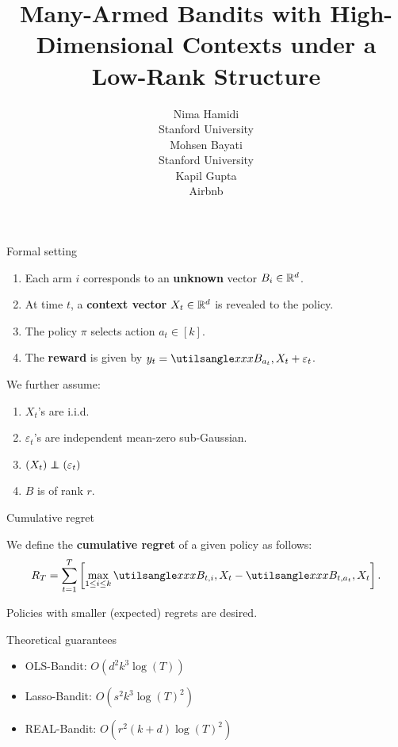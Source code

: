 \documentclass{beamer}
\title[REAL-Bandit]{Many-Armed Bandits with High-Dimensional Contexts under a Low-Rank Structure}
\author[N. Hamidi, M. Bayati, K. Gupta]{Nima Hamidi\\{\scriptsize Stanford University}\\\vskip3mm
Mohsen Bayati\\{\scriptsize Stanford University}\\\vskip3mm
Kapil Gupta\\{\scriptsize Airbnb}}
\date{}
\newcommand\independent{\protect\mathpalette{\protect\independenT}{\perp}}
\def\independenT#1#2{\mathrel{\rlap{$#1#2$}\mkern2mu{#1#2}}}
\begin{document}
\begin{frame}
\titlepage %
\end{frame}

\begin{frame}{Formal setting}
\begin{enumerate}
    \item Each arm $i$ corresponds to an \textbf{unknown} vector $B_i\in\mathbb{R}^d$.
    \vskip7mm
    \item At time $t$, a \textbf{context vector} $X_t\in\mathbb{R}^d$ is revealed to the policy.
    \vskip7mm
    \item The policy $\pi$ selects action $a_t\in[k]$.
    \vskip7mm
    \item The \textbf{reward} is given by $y_t=\inner{B_{a_t}, X_t}+\varepsilon_{t}$.
\end{enumerate}
\pause
\bigskip

We further assume:
\begin{enumerate}
\item $X_t$'s are i.i.d.
\item $\varepsilon_t$'s are independent mean-zero sub-Gaussian.
\item $(X_t)\independent(\varepsilon_t)$
\item $B$ is of rank $r$.
\end{enumerate}

\end{frame}

\begin{frame}{Cumulative regret}
\begin{definition}
We define the \textbf{cumulative regret} of a given policy as follows:
\begin{align*}
R_T=\sum_{t=1}^T\left[\max_{1\leq i\leq k}\inner{B_{t,i},X_t}-\inner{B_{t,a_t},X_t}\right].
\end{align*}
\end{definition}
Policies with smaller (expected) regrets are desired.
\end{frame}

\begin{frame}{Theoretical guarantees}
    \begin{itemize}
        \item OLS-Bandit: $O(d^2k^3\log(T))$ {\color{blue}\cite{ols-bandit}}
        \vskip7mm
        \item Lasso-Bandit: $O(s^2k^3\log(T)^2)$ {\color{blue}\cite{lasso-bandit}}
        \vskip7mm
        \item REAL-Bandit: $O(r^2(k+d)\log(T)^2)$
    \end{itemize}
\end{frame}
\end{document}
